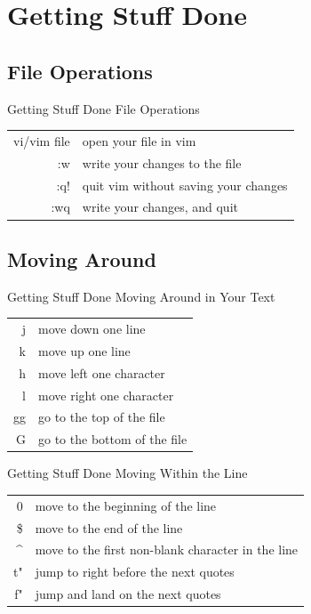 \documentclass{beamer}
\begin{document}
\section{Getting Stuff Done}

\subsection{File Operations}
\begin{frame}[c]{Getting Stuff Done} {File Operations}
    \begin{table}[htpb]
        \centering
        \begin{tabular}{r|l}
            vi/vim file & open your file in vim \\
            :w & write your changes to the file \\
            :q! & quit vim without saving your changes \\
            :wq & write your changes, and quit \\
        \end{tabular}
    \end{table}
\end{frame}


\subsection{Moving Around}
\begin{frame}[c]{Getting Stuff Done} {Moving Around in Your Text} 
    \begin{table}[htpb]
        \centering
        \begin{tabular}{r|l}
            j & move down one line \\
            k & move up one line \\
            h & move left one character \\
            l & move right one character \\
            gg & go to the top of the file \\
            G & go to the bottom of the file \\
        \end{tabular}
    \end{table}
\end{frame}

\begin{frame}[c]{Getting Stuff Done} {Moving Within the Line} 
    \begin{table}[htpb]
        \centering
        \begin{tabular}{r|l}
            0 & move to the beginning of the line \\
            \$ & move to the end of the line \\
            \^{} & move to the first non-blank character in the line \\
            t" & jump to right before the next quotes \\
            f" & jump and land on the next quotes \\
        \end{tabular}
    \end{table}
\end{frame}
\end{document}

